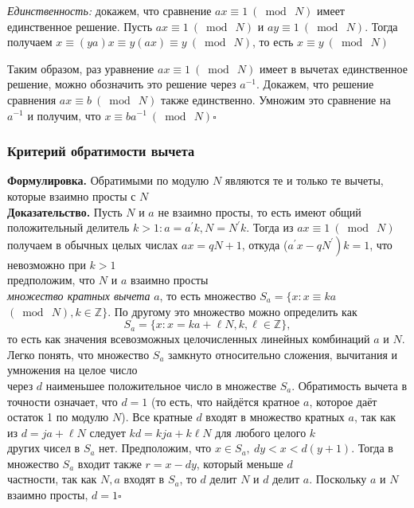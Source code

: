 \documentclass[a4paper]{article}
\newcommand{\qed}{\hfill$\square$}
\begin{document}
\textit{Единственность:} докажем, что сравнение $a x \equiv 1\ (\bmod\ N)$ имеет единственное решение. 
Пусть $a x \equiv 1\ (\bmod\ N)$ и $a y \equiv 1\ (\bmod\ N)$. Тогда получаем 
$x \equiv(y a) x \equiv y(a x) \equiv y\ (\bmod\ N)$, то есть $x \equiv y\ (\bmod\ N)$

Таким образом, раз уравнение $a x \equiv 1\ (\bmod\ N)$ имеет в вычетах единственное решение, можно обозначить это 
решение через $a^{-1}$. Докажем, что решение сравнения $a x \equiv b\ (\bmod\ N)$ также единственно. Умножим это 
сравнение на $a^{-1}$ и получим, что $x \equiv b a^{-1}\ (\bmod\ N)$\qed

\subsubsection*{Критерий обратимости вычета}\label{2.47}
\textbf{Формулировка.} Обратимыми по модулю $N$ являются те и только те вычеты, которые взаимно просты с $N$\\[4mm]
\indent\textbf{Доказательство.} Пусть $N$ и $a$ не взаимно просты, то есть имеют общий положительный делитель $k>1: a=a^{\prime} k, N=N^{\prime} k$. Тогда из $a x \equiv 1\ (\bmod\ N)$ получаем в обычных целых числах $a x=q N+1$, откуда ($\left.a^{\prime} x-q N^{\prime}\right) k=1$, что невозможно при $k>1$\\[2mm]
 предположим, что $N$ и $a$ взаимно просты\\[2mm]
 \textit{множество кратных вычета} $a$, то есть множество $S_{a}=\{x: x \equiv k a$ $(\bmod\ N), k \in \mathbb{Z}\}$. По другому это множество можно определить как
$$
S_{a}=\{x: x=k a+\ell N, k, \ell \in \mathbb{Z}\},
$$
то есть как значения всевозможных целочисленных линейных комбинаций $a$ и $N$. Легко понять, что множество $S_{a}$ замкнуто относительно сложения, вычитания и умножения на целое число\\[2mm]
 через $d$ наименьшее положительное число в множестве $S_{a}$. Обратимость вычета в точности означает, что $d=1$ (то есть, что найдётся кратное $a$, которое даёт остаток 1 по модулю $N$). Все кратные $d$ входят в множество кратных $a$, так как из $d=j a+\ell N$ следует $k d=k j a+k \ell N$ для любого целого $k$\\[2mm]
 других чисел в $S_{a}$ нет. Предположим, что $x \in S_{a},\ d y<x<d(y+1)$. Тогда в множество $S_{a}$ входит также $r=x-d y$, который меньше $d$\\[2mm]
 частности, так как $N, a$ входят в $S_{a}$, то $d$ делит $N$ и $d$ делит $a$. Поскольку $a$ и $N$ взаимно просты, $d=1$\qed
\end{document}
